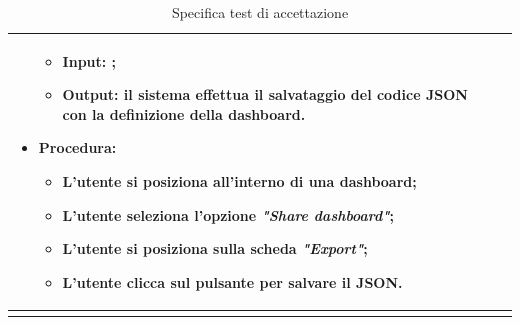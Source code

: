 \begin{longtable}{|C{2.5cm}|C{13cm}|}
\begin{itemize}
	\begin{itemize}
		\item \textbf{Input}: ;
		\item \textbf{Output}: il sistema effettua il salvataggio del codice JSON con la definizione della dashboard.
	\end{itemize}
	\item \textbf{Procedura}:
	\begin{itemize}
		\item L'utente si posiziona all'interno di una dashboard;
		\item L'utente seleziona l'opzione \emph{"Share dashboard"};
		\item L'utente si posiziona sulla scheda \emph{"Export"};
		\item L'utente clicca sul pulsante per salvare il JSON.
	\end{itemize} 
\end{itemize}\\
\hline
\caption{Specifica test di accettazione}
\end{longtable}
\renewcommand{\arraystretch}{1}
\newpage

